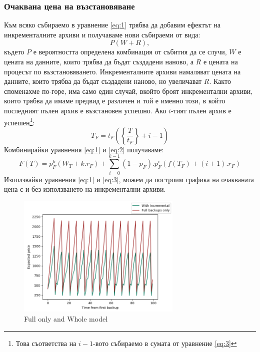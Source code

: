 \documentclass[11pt, a4paper]{article}
\theoremstyle{definition}
\begin{document}
			\subsubsection{Очаквана цена на възстановяване}
				Към всяко събираемо в уравнение \ref{eq:1} трябва да добавим ефектът на инкременталните архиви и получаваме нови събираеми от вида:
				$$
				P(W + R),
				$$
				където $P$ е вероятността определена комбинация от събития да се случи, $W$ е цената на данните, които трябва да бъдат създадени наново, а $R$ е цената на процесът по възстановяването. Инкременталните архиви намаляват цената на данните, които трябва да бъдат създадени наново, но увеличават $R$. Както споменахме по-горе, има само един случай, вкойто броят инкрементални архиви, които трябва да имаме предвид е различен и той е именно този, в който последният пълен архив е възстановен успешно. Ако $i$-тият пълен архив е успешен\footnote{Това съответства на $i-1$-вото събираемо в сумата от уравнение \ref{eq:3}}:
				$$
				T_F=t_F\left(\left\{ \frac{T}{t_F} \right\} + i - 1\right)
				$$
				Комбинирайки уравнения \ref{eq:1} и \ref{eq:2} получаваме:
				\begin{equation}\label{eq:3}
				F(T) = p_F^{k}(W_T+k.r_F) + \displaystyle\sum_{i=0}^{k-1}(1-p_F).p_F^{i}\left(f(T_F) + (i+1).r_F\right)
				\end{equation}
				Използвайки уравнения \ref{eq:1} и \ref{eq:3}, можем да построим графика на очакваната цена с и без използването на инкрементални архиви.
				\begin{figure}[H]
					\begin{minipage}{1.0\textwidth}
						\centering
						\includegraphics[width=0.7\textwidth]{Weekly_full.png}
						\caption{Full only and Whole model}\label{Fig:FullWeekly}
					\end{minipage}
				\end{figure}
\end{document}
